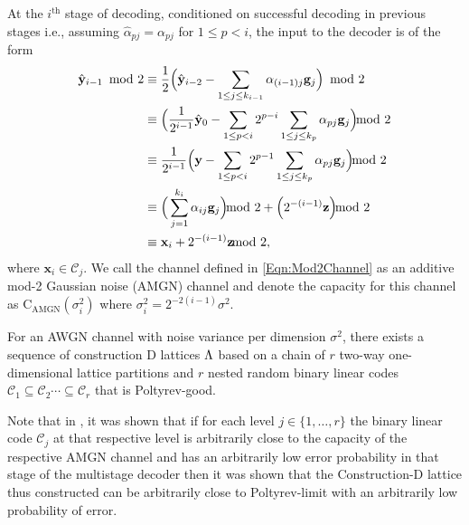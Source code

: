 \documentclass[journal,twocolumn]{IEEEtran}
\begin{document}
At the $i^{\text{th}}$ stage of decoding, conditioned on successful decoding in previous stages i.e., assuming $\hat{\alpha}_{pj}=\alpha_{pj}$ for $1\leq p < i$, the input to the decoder is of the form
\begin{align}
\hat{\mathbf{y}}_{i-1}\! \mod 2&\equiv\frac{1}{2}\Big(\hat{\mathbf{y}}_{i-2}-\sum_{1\leq j\leq k_{i-1}}\alpha_{(i-1)j}\mathbf{g}_j\Big)\!\mod 2\notag\\
&\equiv \Big( \frac{1}{2^{i-1}}\hat{\mathbf{y}}_{0}-\sum_{1\leq p< i}2^{p-i}\sum_{1\leq j\leq k_{p}}\alpha_{pj}\mathbf{g}_j \Big) \hspace{-8pt}\mod 2\notag\\
&\equiv\frac{1}{2^{i-1}}\Big( \mathbf{y}-\sum_{1\leq p< i}2^{p-1}\sum_{1\leq j\leq k_{p}}\alpha_{pj}\mathbf{g}_j \Big) \hspace{-8pt}\mod 2\notag\\
&\equiv\Big(\sum_{j=1}^{k_{i}}\alpha_{ij}\mathbf{g}_j \Big) \hspace{-8pt}\mod 2 + \Big( 2^{-(i-1)}\mathbf{z} \Big) \hspace{-8pt}\mod 2\notag\\
&\equiv\mathbf{x}_{i}+2^{-(i-1)}\mathbf{z} \hspace{-8pt}\mod 2,
\label{Eqn:Mod2Channel}
\end{align}
where $\mathbf{x}_{i}\in\mathcal{C}_{j}$. We call the channel defined in \eqref{Eqn:Mod2Channel} as an additive mod-2 Gaussian noise (AMGN) channel \cite{forney2000} and denote the capacity for this channel as  $\text{C}_{\text{AMGN}}(\sigma^{2}_{i})$ where $\sigma_{i}^{2}=2^{-2(i-1)}\sigma^2$.

\begin{theorem}
For an AWGN channel with noise variance per dimension $\sigma^{2}$, there exists a sequence of construction D lattices $\Lambda$ based on a chain of $r$ two-way one-dimensional lattice partitions and $r$ nested random binary linear codes $\mathcal{C}_{1}\subseteq \mathcal{C}_{2}\cdots \subseteq \mathcal{C}_{r}$ that is Poltyrev-good.
\end{theorem}

\begin{Remark}\label{Rmk:Forney_proof}
    Note that in \cite{forney2000}, it was shown that if for each level $j\in\{1,\ldots,r\}$ the binary linear code $\mathcal{C}_{j}$ at that respective level is arbitrarily close to the capacity of the respective AMGN channel and has an arbitrarily low error probability in that stage of the multistage decoder then it was shown that the Construction-D lattice thus constructed can be arbitrarily close to Poltyrev-limit with an arbitrarily low probability of error.
\end{Remark}
\end{document}
